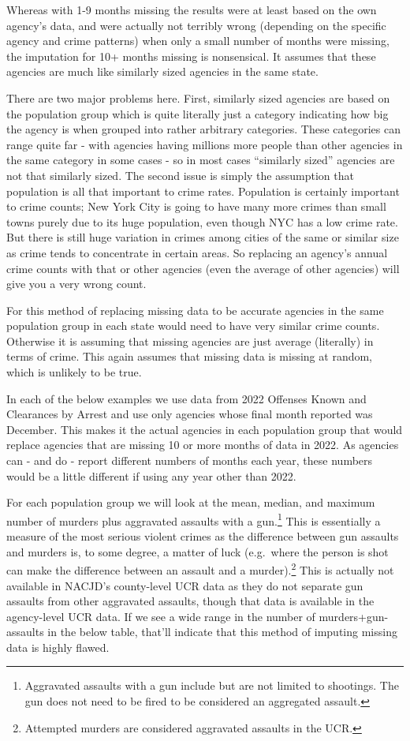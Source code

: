 \documentclass[
]{krantz}
\begin{document}
Whereas with 1-9 months missing the results were at least
based on the own agency's data, and were actually not
terribly wrong (depending on the specific agency and crime
patterns) when only a small number of months were missing,
the imputation for 10+ months missing is nonsensical. It
assumes that these agencies are much like similarly sized
agencies in the same state.

There are two major problems here. First, similarly sized
agencies are based on the population group which is quite
literally just a category indicating how big the agency is
when grouped into rather arbitrary categories. These
categories can range quite far - with agencies having
millions more people than other agencies in the same
category in some cases - so in most cases ``similarly
sized'' agencies are not that similarly sized. The second
issue is simply the assumption that population is all that
important to crime rates. Population is certainly important
to crime counts; New York City is going to have many more
crimes than small towns purely due to its huge population,
even though NYC has a low crime rate. But there is still
huge variation in crimes among cities of the same or similar
size as crime tends to concentrate in certain areas. So
replacing an agency's annual crime counts with that or other
agencies (even the average of other agencies) will give you
a very wrong count.

For this method of replacing missing data to be accurate
agencies in the same population group in each state would
need to have very similar crime counts. Otherwise it is
assuming that missing agencies are just average (literally)
in terms of crime. This again assumes that missing data is
missing at random, which is unlikely to be true.

In each of the below examples we use data from 2022 Offenses
Known and Clearances by Arrest and use only agencies whose
final month reported was December. This makes it the actual
agencies in each population group that would replace
agencies that are missing 10 or more months of data in 2022.
As agencies can - and do - report different numbers of
months each year, these numbers would be a little different
if using any year other than 2022.

For each population group we will look at the mean, median,
and maximum number of murders plus aggravated assaults with
a gun.\footnote{Aggravated assaults with a gun include but
  are not limited to shootings. The gun does not need to be
  fired to be considered an aggregated assault.} This is
essentially a measure of the most serious violent crimes as
the difference between gun assaults and murders is, to some
degree, a matter of luck (e.g.~where the person is shot can
make the difference between an assault and a
murder).\footnote{Attempted murders are considered
  aggravated assaults in the UCR.} This is actually not
available in NACJD's county-level UCR data as they do not
separate gun assaults from other aggravated assaults, though
that data is available in the agency-level UCR data. If we
see a wide range in the number of murders+gun-assaults in
the below table, that'll indicate that this method of
imputing missing data is highly flawed.
\end{document}
